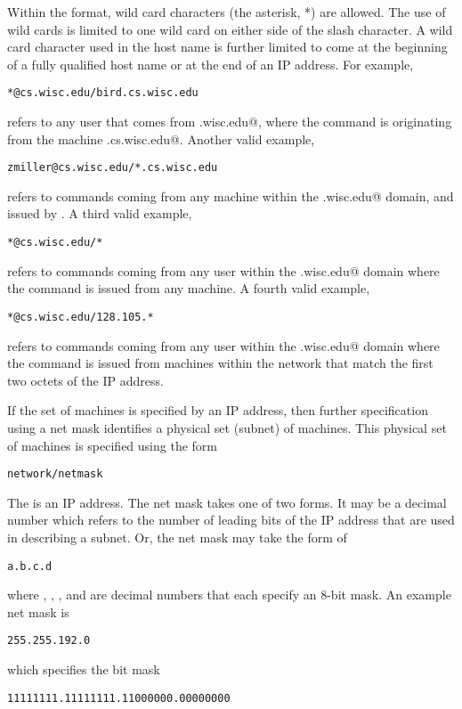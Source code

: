 Within the format, wild card characters (the asterisk, *) are allowed.
The use of wild cards is limited to one wild card on either side
of the slash character.
A wild card character used in the host name is further limited
to come at the beginning of a fully qualified host name
or at the end of an IP address.
For example,
\begin{verbatim}
*@cs.wisc.edu/bird.cs.wisc.edu
\end{verbatim}
refers to any user that comes from \verb@cs.wisc.edu@,
where the command is originating from the machine
\verb@bird.cs.wisc.edu@.
Another valid example,
\begin{verbatim}
zmiller@cs.wisc.edu/*.cs.wisc.edu
\end{verbatim}
refers to commands coming from any machine within the 
\verb@cs.wisc.edu@ domain, and issued by \verb@zmiller@.
A third valid example,
\begin{verbatim}
*@cs.wisc.edu/*
\end{verbatim}
refers to commands coming from any user within the 
\verb@cs.wisc.edu@ domain
where the command is issued from any machine.
A fourth valid example,
\begin{verbatim}
*@cs.wisc.edu/128.105.*
\end{verbatim}
refers to commands coming from any user within the 
\verb@cs.wisc.edu@ domain
where the command is issued from machines within the network that match
the first two octets of the IP address.

If the set of machines is specified by an IP address,
then further specification using a net mask
identifies a physical set (subnet) of machines.
This physical set of machines is specified using the form
\begin{verbatim}
network/netmask
\end{verbatim}
The \verb@network@ is an IP address.
The net mask takes one of two forms.
It may be a decimal number which refers to the number of leading
bits of the IP address that are used in describing a subnet.
Or, the net mask may take the form of
\begin{verbatim}
a.b.c.d
\end{verbatim}
where \verb@a@,
\verb@b@,
\verb@c@, and
\verb@d@
are decimal numbers that each specify an 8-bit mask.
An example net mask is
\begin{verbatim}
255.255.192.0
\end{verbatim}
which specifies the bit mask
\begin{verbatim}
11111111.11111111.11000000.00000000
\end{verbatim}

